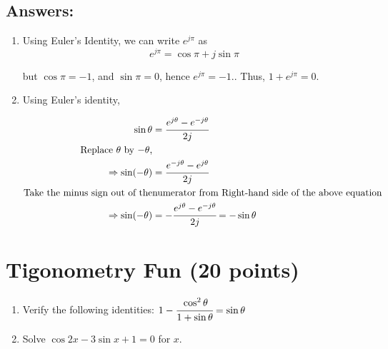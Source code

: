\documentclass[12pt, xcolor=dvipsnames,svgnames,x11names]{article}
\newcommand{\showanswers}{no}
\begin{document}
   \ifthenelse{\equal{\showanswers}{yes}}
   {
   \subsection{Answers:}

   \begin{enumerate}
      \item Using Euler's Identity, we can write $e^{j\pi}$ as 
      $$
      e^{j\pi} = \cos\pi + j \sin \pi
      $$

      but $\cos\pi = -1$, and $\sin \pi = 0$, hence $e^{j\pi} = -1.$. Thus, $1 + e^{j\pi}  = 0$.

      \item Using Euler's identity, 

      \begin{equation}
         \begin{split}
               \sin \theta & = \cfrac{e^{j\theta} - e^{-j\theta}}{2j}\\
               \text{Replace $\theta$ by $-\theta$,}\\
               \Rightarrow \sin(-\theta) & = \cfrac{e^{-j\theta} - e^{j\theta}}{2j}\\
               \text{Take the minus sign out of the} &\text{numerator from Right-hand side of the above equation}\\
               \Rightarrow \sin(-\theta) & = - \cfrac{e^{j\theta} - e^{-j\theta}}{2j} = -\sin \theta
         \end{split}
      \end{equation}
   \end{enumerate}
   }

   \section{Tigonometry Fun (20 points)}

   \begin{enumerate}
      \item Verify the following identities: $1 - \cfrac{\cos^2 \theta}{1+\sin\theta} = \sin \theta$

      
      \item Solve $\cos 2x - 3\sin x + 1 = 0$ for $x$.
   \end{enumerate}
\end{document}
